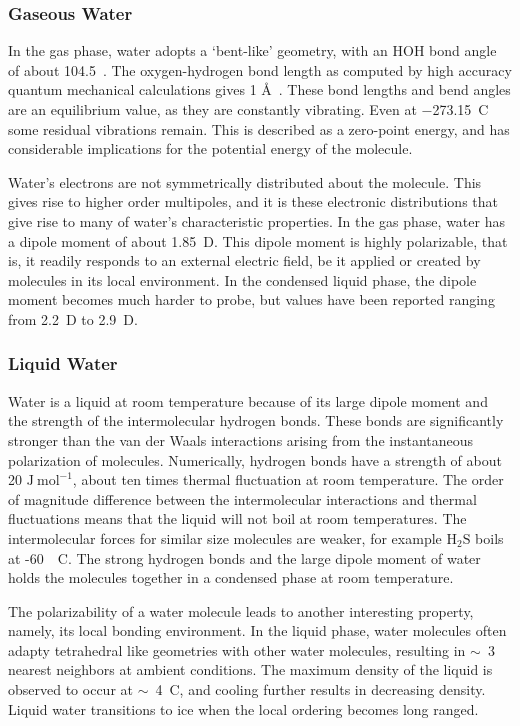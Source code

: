 \subsubsection{Gaseous Water}
In the gas phase, water adopts a `bent-like' geometry, with an HOH
bond angle of about 104.5\degree~. The oxygen-hydrogen bond length as
computed by high accuracy quantum mechanical calculations gives 1
\AA~. These bond lengths and bend angles are an equilibrium value, as
they are constantly vibrating. Even at $-$273.15~\degree C some
residual vibrations remain. This is described as a zero-point energy,
and has considerable implications for the potential energy of the
molecule.

Water's electrons are not symmetrically distributed about the
molecule. This gives rise to higher order multipoles, and it is these
electronic distributions that give rise to many of water's
characteristic properties. In the gas phase, water has a dipole moment
of about 1.85~D. This dipole moment is highly polarizable, that is, it
readily responds to an external electric field, be it applied or
created by molecules in its local environment. In the condensed liquid
phase, the dipole moment becomes much harder to probe, but values have
been reported ranging from 2.2~D to 2.9~D.


\subsubsection{Liquid Water}
Water is a liquid at room temperature because of its large dipole
moment and the strength of the intermolecular hydrogen bonds. These
bonds are significantly stronger than the van der Waals interactions
arising from the instantaneous polarization of molecules. Numerically,
hydrogen bonds have a strength of about 20
$\mathrm{J}~\mathrm{mol}^{-1}$, about ten times thermal fluctuation at
room temperature. The order of magnitude difference between the
intermolecular interactions and thermal fluctuations means that the
liquid will not boil at room temperatures. The intermolecular forces
for similar size molecules are weaker, for example
$\mathrm{H}_2\mathrm{S}$ boils at -60~\degree~C. The strong hydrogen
bonds and the large dipole moment of water holds the molecules
together in a condensed phase at room temperature.

The polarizability of a water molecule leads to another interesting
property, namely, its local bonding environment. In the liquid phase,
water molecules often adapty tetrahedral like geometries with other
water molecules, resulting in $\sim$~3 nearest neighbors at ambient
conditions. The maximum density of the liquid is observed to occur at
$\sim$~4\degree~C, and cooling further results in decreasing
density. Liquid water transitions to ice when the local ordering
becomes long ranged.



